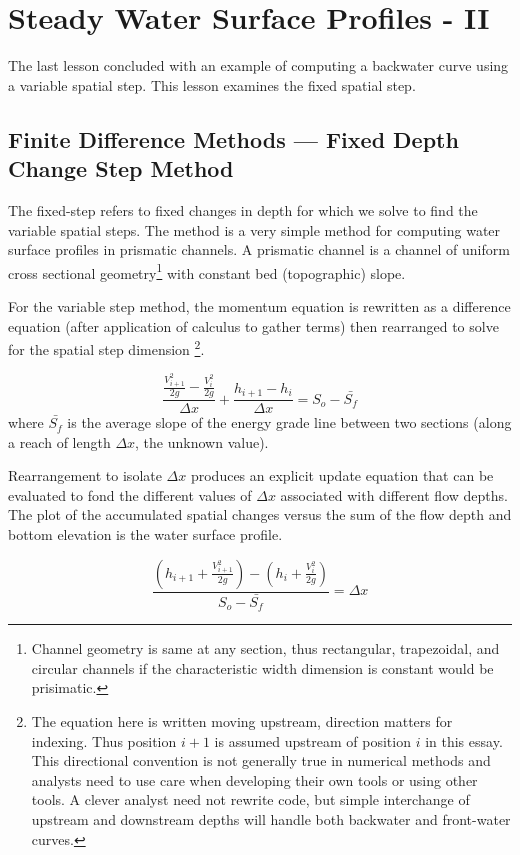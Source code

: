 \section{Steady Water Surface Profiles - II}
The last lesson concluded with an example of computing a backwater curve using a variable spatial step.
This lesson examines the fixed spatial step.
\subsection{Finite Difference Methods --- Fixed Depth Change Step Method}
The fixed-step refers to fixed changes in depth for which we solve to find the variable spatial steps.
The method is a very simple method for computing water surface profiles in prismatic channels.
A prismatic channel is a channel of uniform cross sectional geometry\footnote{Channel geometry is same at any section, thus rectangular, trapezoidal, and circular channels if the characteristic width dimension is constant would be prisimatic.} with constant bed (topographic) slope.  


For the variable step method, the momentum equation is rewritten as a difference equation (after application of calculus to gather terms) then rearranged to solve for the spatial step dimension
\footnote{The equation here is written moving upstream, direction matters for indexing.  Thus position $i+1$ is assumed upstream of position $i$ in this essay.  This directional convention is not generally true in numerical methods and analysts need to use care when developing their own tools or using other tools.  A clever analyst need not rewrite code, but simple interchange of upstream and downstream depths will handle both backwater and front-water curves.}.

\begin{equation}
\frac{\frac{V_{i+1}^2}{2g} - \frac{V_{i}^2}{2g}}{\Delta x} + \frac{h_{i+1} - h_{i}}{\Delta x} = S_o - \bar{S_f}
\end{equation}
where $\bar{S_f}$ is the average slope of the energy grade line between two sections (along a reach of length $\Delta x$, the unknown value).

Rearrangement to isolate $\Delta x$ produces an explicit update equation that can be evaluated to fond the different values of $\Delta x$ associated with different flow depths.  The plot of the accumulated spatial changes versus the sum of the flow depth and bottom elevation is the water surface profile.

\begin{equation}
\frac{   (h_{i+1}  +  \frac{V_{i+1}^2}{2g}) - (h_{i} + \frac{V_{i}^2}{2g})}{S_o - \bar{S_f} }  = \Delta x
\end{equation}

